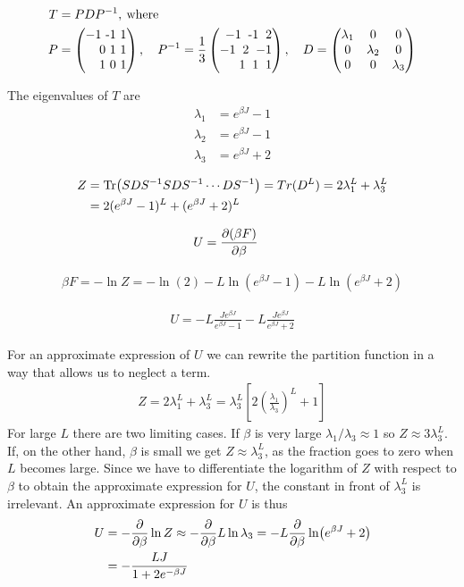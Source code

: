 \documentclass[reprint,english,notitlepage,aps,nobalancelastpage,nofootinbib]{revtex4-1}
\newcommand{\closed}[1]{\left(#1\right)}
\newcommand{\bracket}[1]{\left[#1\right]}
\newcommand{\ebj}{e^{\beta J}}
\renewcommand{\l}{\lambda}
\begin{document}
\begin{align*}
	T &= PDP^{-1}, \:\mathrm{where}\: \\ 
	P &= 
	\begin{pmatrix*}[r]
		-1 $ -1 $ 1 \\ 
		0 $ 1 $ 1 \\ 
		1 $ 0 $ 1 
	\end{pmatrix*} ,\quad 
	P^{-1} = \frac{1}{3} 
	\begin{pmatrix*}[r]
		-1 $ \:-1 $\: 2 \\ 
		-1 $  \:2 $\: -1 \\ 
		1  $ \:1 $\: 1
	\end{pmatrix*},\quad
	D = \begin{pmatrix*}
		\lambda_1 & 0 & 0 \\ 
		0 & \lambda_2 & 0 \\
		0 & 0 & \lambda_3 
	\end{pmatrix*}
\end{align*}

The eigenvalues of $T$ are 
\begin{align*}
	\lambda_1 &= \ebj-1 \\ 
	\lambda_2 &= \ebj-1 \\ 
	\lambda_3 &= \ebj+2
\end{align*}


\begin{align*}
	Z &= \Tr(SDS^{-1}SDS^{-1}\cdots DS^{-1})=Tr(D^L)=2\lambda_1^L + \lambda_3^L \\ 
	&= 2(\ebj-1)^L + (\ebj+2)^L
\end{align*}

\begin{align*}
	U &= \pdv{(\beta F)}{\beta}
\end{align*}

\begin{align*}
	\beta F = -\ln Z = -\ln(2)-L\ln(\ebj-1)-L\ln(\ebj+2)
\end{align*}

\begin{align*}
	U = -L \frac{J\ebj}{\ebj-1} - L \frac{J\ebj}{\ebj+2}
\end{align*}

For an approximate expression of $U$ we can rewrite the partition function in a way that allows us to neglect a term. 
\begin{align*}
	Z = 2\l_1^L + \l_3^L = \l_3^L\bracket{2\closed{\frac{\l_1}{\l_3}}^L+1}
\end{align*} 
For large $L$ there are two limiting cases. If $\beta$ is very large $\l_1/\l_3\approx1$ so $Z\approx 3\l_3^L$. If, on the other hand, $\beta$ is small we get $Z\approx \l_3^L$, as the fraction goes to zero when $L$ becomes large. Since we have to differentiate the logarithm of $Z$ with respect to $\beta$ to obtain the approximate expression for $U$, the constant in front of $\l_3^L$ is irrelevant. An approximate expression for $U$ is thus 
\begin{align*}
	U&=-\pdv{\beta}\ln Z \approx -\pdv{\beta} L \ln \l_3 = -L \pdv{\beta}\ln (\ebj+2) \\ 
	&= -\frac{LJ}{1+2 e^{-\beta J}} 
\end{align*}
\end{document}
